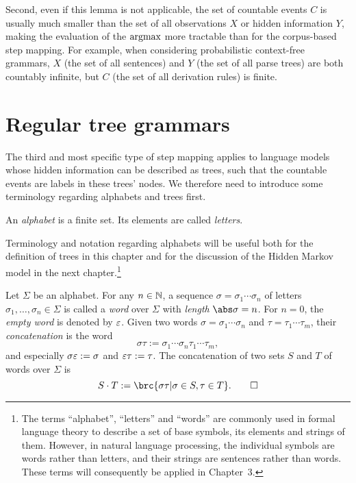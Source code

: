 Second, even if this lemma is not applicable, the set of countable events $C$ is
usually much smaller than the set of all observations $X$ or hidden information
$Y$, making the evaluation of the $\argmax$ more tractable than for the
corpus-based step mapping. For example, when considering probabilistic
context-free grammars, $X$ (the set of all sentences) and $Y$ (the set of all
parse trees) are both countably infinite, but $C$ (the set of all derivation
rules) is finite.

\section{Regular tree grammars}

The third and most specific type of step mapping applies to language models
whose hidden information can be described as trees, such that the countable
events are labels in these trees' nodes. We therefore need to introduce some
terminology regarding alphabets and trees first.

\begin{definition}
 An \emph{alphabet} is a finite set. Its elements are called \emph{letters}.
\end{definition}

Terminology and notation regarding alphabets will be useful both for the
definition of trees in this chapter and for the discussion of the Hidden Markov
model in the next chapter.\footnote{The terms ``alphabet'', ``letters'' and
``words'' are commonly used in formal language theory to describe a set of base
symbols, its elements and strings of them. However, in natural language
processing, the individual symbols are words rather than letters, and their
strings are sentences rather than words. These terms will consequently be
applied in Chapter~3.}

\begin{definition}
 Let $\Sigma$ be an alphabet. For any $n\in\mathbb N$, a sequence $\sigma =
 \sigma_1\cdots\sigma_n$ of letters $\sigma_1,\ldots,\sigma_n\in\Sigma$ is
 called a \emph{word} over $\Sigma$ with \emph{length} $\abs\sigma = n$. For
 $n=0$, the \emph{empty word} is denoted by $\varepsilon$. Given two words
 $\sigma=\sigma_1\cdots\sigma_n$ and $\tau=\tau_1\cdots\tau_m$, their
 \emph{concatenation} is the word
 \[
  \sigma\tau := \sigma_1\cdots\sigma_n\tau_1\cdots\tau_m,
 \]
 and especially $\sigma\varepsilon := \sigma$ and $\varepsilon\tau := \tau$. The
 concatenation of two sets $S$ and $T$ of words over $\Sigma$ is
 \[
  S\cdot T := \brc{\sigma\tau|\sigma\in S, \tau\in T}.\qedhere
 \]
\end{definition}

